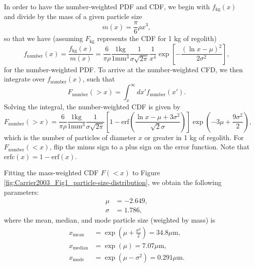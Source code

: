 \documentclass{hitec}
\numberwithin{equation}{section}
\begin{document}
In order to have the number-weighted PDF and CDF, we begin with $f_{\text{kg}}(x)$ and divide by the mass of a given particle size
\begin{equation}
	m(x) = \frac{\pi}{6}\rho x^3,
\end{equation}
so that we have (assuming $F_{\text{kg}}$ represents the CDF for 1 kg of regolith)
\begin{equation}
	f_{\text{number}}(x) = \frac{f_{\text{kg}}(x)}{m(x)} = \frac{6}{\pi\rho}\frac{1 \text{kg}}{1 \text{mm}^3}\frac{1}{\sigma\sqrt{2\pi}}
	\frac{1}{x^4}\exp\left[-\frac{(\ln x - \mu)^2}{2\sigma^2}\right],
\end{equation}
for the number-weighted PDF. To arrive at the number-weighted CFD, we then integrate over $f_{\text{number}}(x)$, such that
\begin{equation}
	F_{\text{number}}(>x) = \int_{x}^{\infty}dx' f_{\text{number}}(x').
\end{equation}
Solving the integral, the number-weighted CDF is given by
\begin{equation}\label{eq:number_CFD_regolith}
	F_{\text{number}}(>x) = \frac{6}{\pi\rho}\frac{1 \text{kg}}{1 \text{mm}^3}\frac{1}{\sigma\sqrt{2\pi}}
	\left[1 - \text{erf}\left(\frac{\ln x - \mu + 3\sigma^2}{\sqrt{2}\sigma}\right)\right]\exp\left(-3\mu + \frac{9\sigma^2}{2}\right),
\end{equation}
which is the number of particles of diameter $x$ or greater in 1 kg of regolith. For $F_{\text{number}}(<x)$, flip the minus sign to a plus sign on the error function. Note that $\text{erfc}(x) = 1- \text{erf}(x)$.

Fitting the mass-weighted CDF $F(<x)$ to Figure \ref{fig:Carrier2003_Fig1_particle-size-distribution}, we obtain the following parameters:
\begin{align}
	\mu &= -2.649,\\
	\sigma &= 1.786,
\end{align}
where the mean, median, and mode particle size (weighted by mass) is
\begin{align}
	x_{\text{mean}} &= \exp\left(\mu + \frac{\sigma^2}{2}\right) = 34.8 \text{$\mu$m},\\
	x_{\text{median}} &= \exp(\mu) = 7.07 \text{$\mu$m},\\
	x_{\text{mode}} &=  \exp\left(\mu - \sigma^2\right) = 0.291 \text{$\mu$m}.
\end{align}
\end{document}
